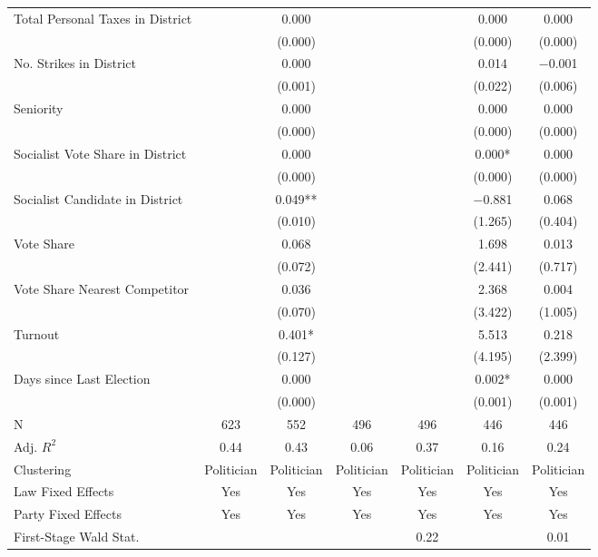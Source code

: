 \begin{table}[!h]
{\begin{threeparttable}
\begin{tabular}[t]{lcccccc}
Total Personal Taxes in District &  & \num{0.000} &  &  & \num{0.000} & \num{0.000}\\
 &  & (\num{0.000}) &  &  & (\num{0.000}) & \vphantom{2} (\num{0.000})\\
No. Strikes in District &  & \num{0.000} &  &  & \num{0.014} & \num{-0.001}\\
 &  & (\num{0.001}) &  &  & (\num{0.022}) & (\num{0.006})\\
Seniority &  & \num{0.000} &  &  & \num{0.000} & \num{0.000}\\
 &  & (\num{0.000}) &  &  & (\num{0.000}) & \vphantom{1} (\num{0.000})\\
Socialist Vote Share in District &  & \num{0.000} &  &  & \num{0.000}* & \num{0.000}\\
 &  & (\num{0.000}) &  &  & (\num{0.000}) & (\num{0.000})\\
Socialist Candidate in District &  & \num{0.049}** &  &  & \num{-0.881} & \num{0.068}\\
 &  & (\num{0.010}) &  &  & (\num{1.265}) & (\num{0.404})\\
Vote Share &  & \num{0.068} &  &  & \num{1.698} & \num{0.013}\\
 &  & (\num{0.072}) &  &  & (\num{2.441}) & (\num{0.717})\\
Vote Share Nearest Competitor &  & \num{0.036} &  &  & \num{2.368} & \num{0.004}\\
 &  & (\num{0.070}) &  &  & (\num{3.422}) & (\num{1.005})\\
Turnout &  & \num{0.401}* &  &  & \num{5.513} & \num{0.218}\\
 &  & (\num{0.127}) &  &  & (\num{4.195}) & (\num{2.399})\\
Days since Last Election &  & \num{0.000} &  &  & \num{0.002}* & \num{0.000}\\
 &  & (\num{0.000}) &  &  & (\num{0.001}) & (\num{0.001})\\
\midrule
N & \num{623} & \num{552} & \num{496} & \num{496} & \num{446} & \num{446}\\
Adj. $R^2$ & \num{0.44} & \num{0.43} & \num{0.06} & \num{0.37} & \num{0.16} & \num{0.24}\\
Clustering & Politician & Politician & Politician & Politician & Politician & Politician\\
Law Fixed Effects & Yes & Yes & Yes & Yes & Yes & Yes\\
Party Fixed Effects & Yes & Yes & Yes & Yes & Yes & Yes\\
First-Stage Wald Stat. &  &  &  & 0.22 &  & 0.01\\

\end{tabular}
\end{threeparttable}}
\end{table}
